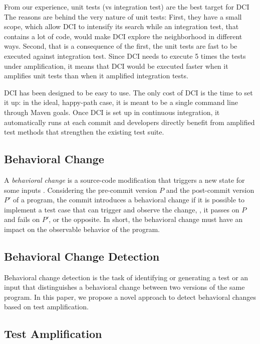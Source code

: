From our experience, unit tests (vs integration test) are the best target for DCI
The reasons are behind the very nature of unit tests:
First, they have a small scope, which allow DCI to intensify its search while an integration test, that contains a lot of code, would make DCI explore the neighborhood in different ways.
Second, that is a consequence of the first, the unit tests are fast to be executed against integration test.
Since DCI needs to execute 5 times the tests under amplification, it means that DCI would be executed faster when it amplifies unit tests than when it amplified integration tests.

DCI has been designed to be easy to use.
The only cost of DCI is the time to set it up: in the ideal, happy-path case, it is meant to be a single command line through Maven goals.
Once DCI is set up in continuous integration, it automatically runs at each commit and developers directly benefit from amplified test methods that strengthen the existing test suite.

%
%
\subsection{Behavioral Change}
\label{subsec:behavioral:change}

A \emph{behavioral change} is a source-code modification that triggers a new state for some inputs \cite{saff2004experimental}.
Considering the pre-commit version $P$ and the post-commit version $P'$ of a program, the commit introduces a behavioral change if it is possible to implement a test case that can trigger and observe the change, \ie, it passes on $P$ and fails on $P'$, or the opposite.
In short, the behavioral change must have an impact on the observable behavior of the program.

%
%
\subsection{Behavioral Change Detection}
\label{subsec:behavioral:change:detection}

Behavioral change detection is the task of identifying or generating a test or an input that distinguishes a behavioral change between two versions of the same program.
In this paper, we propose a novel approach to detect behavioral changes based on test amplification.

%
%
\subsection{Test Amplification}

